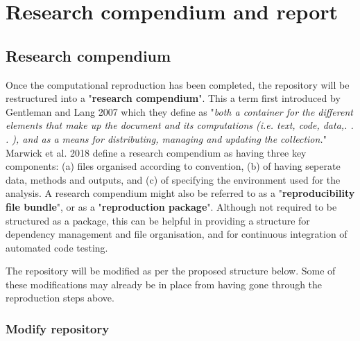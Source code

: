 \section{Research compendium and report}

\subsection{Research compendium} \label{sec:compendium}

Once the computational reproduction has been completed, the repository will be restructured into a "\textbf{research compendium}". This a term first introduced by Gentleman and Lang 2007\autocite{gentleman_statistical_2007} which they define as "\textit{both a container for the different elements that make up the document and its computations (i.e. text, code, data,. . . ), and as a means for distributing, managing and updating the collection.}"\autocite{gentleman_statistical_2007} Marwick et al. 2018 define a research compendium as having three key components: (a) files organised according to convention, (b) of having seperate data, methods and outputs, and (c) of specifying the environment used for the analysis.\autocite{marwick_packaging_2018} A research compendium might also be referred to as a "\textbf{reproducibility file bundle}",\autocite{arguillas_10_2022} or as a "\textbf{reproduction package}".\autocite{krafczyk_learning_2021} Although not required to be structured as a package, this can be helpful in providing a structure for dependency management and file organisation, and for continuous integration of automated code testing.\autocite{marwick_packaging_2018}

The repository will be modified as per the proposed structure below. Some of these modifications may already be in place from having gone through the reproduction steps above.

\vspace{0.5cm}
\subsubsection{Modify repository}

